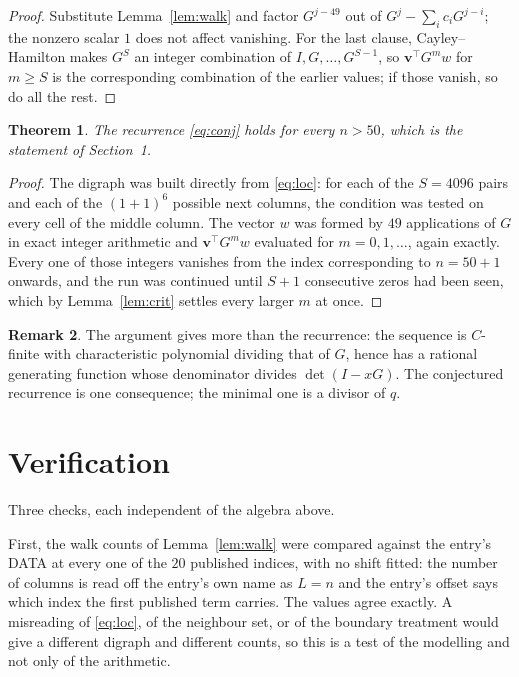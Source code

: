\documentclass[11pt,a4paper]{article}
\theoremstyle{plain}
\newtheorem{theorem}{Theorem}
\theoremstyle{definition}
\newtheorem{remark}[theorem]{Remark}
\begin{document}
\begin{proof}
Substitute Lemma~\ref{lem:walk} and factor $G^{j-49}$ out of
$G^{j}-\sum_ic_iG^{j-i}$; the nonzero scalar $1$ does not affect
vanishing. For the last clause, Cayley--Hamilton makes $G^{S}$ an integer combination of
$I,G,\dots,G^{S-1}$, so $\mathbf{v}^{\!\top}G^{m}w$ for $m\ge S$ is the corresponding
combination of the earlier values; if those vanish, so do all the rest.
\end{proof}

\begin{theorem}
The recurrence \eqref{eq:conj} holds for every $n>50$, which is the statement of
Section~1.
\end{theorem}

\begin{proof}
The digraph was built directly from \eqref{eq:loc}: for each of the $S=4096$ pairs and each
of the $(1+1)^{6}$ possible next columns, the condition was tested on every cell of
the middle column. The vector $w$ was formed by $49$ applications of $G$ in exact integer
arithmetic and $\mathbf{v}^{\!\top}G^{m}w$ evaluated for $m=0,1,\dots$, again exactly.
Every one of those integers vanishes from the index corresponding to $n=50+1$ onwards,
and the run was continued until $S+1$ consecutive zeros had been seen, which by
Lemma~\ref{lem:crit} settles every larger $m$ at once.
\end{proof}

\begin{remark}
The argument gives more than the recurrence: the sequence is $C$-finite with characteristic
polynomial dividing that of $G$, hence has a rational generating function whose denominator
divides $\det(I-xG)$. The conjectured recurrence is one consequence; the minimal one is a
divisor of $q$.
\end{remark}

\section{Verification}

Three checks, each independent of the algebra above.

First, the walk counts of Lemma~\ref{lem:walk} were compared against the entry's DATA at
every one of the $20$ published indices, with no shift fitted: the number of columns is
read off the entry's own name as $L=n$ and the entry's offset says which index the first
published term carries. The values agree exactly. A misreading of \eqref{eq:loc}, of the
neighbour set, or of the boundary treatment would give a different digraph and different
counts, so this is a test of the modelling and not only of the arithmetic.
\end{document}
